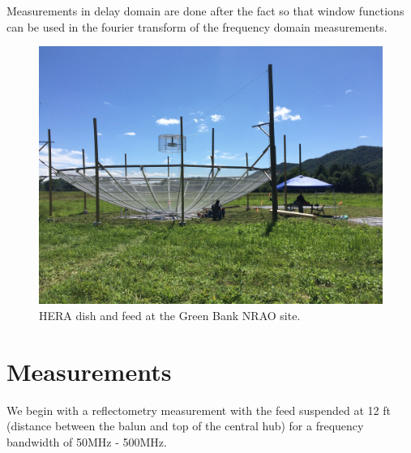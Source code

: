 \documentclass[12pt,preprint]{aastex}
\begin{document}
Measurements in delay domain are done after the fact so that window functions
can be used in the fourier transform of the frequency domain measurements. 

\begin{figure}
\centering
\includegraphics[trim={2cm 20cm 30cm 15cm},clip, totalheight=0.45\textheight]{plots/heradish.jpg}
\caption{HERA dish and feed at the Green Bank NRAO site.}
\label{fig:heradish}
\end{figure}



\section{Measurements}

We begin with a reflectometry measurement with the feed suspended at 12 ft (distance between the balun and top of the central hub) for a frequency bandwidth of 50MHz - 500MHz.
\end{document}
